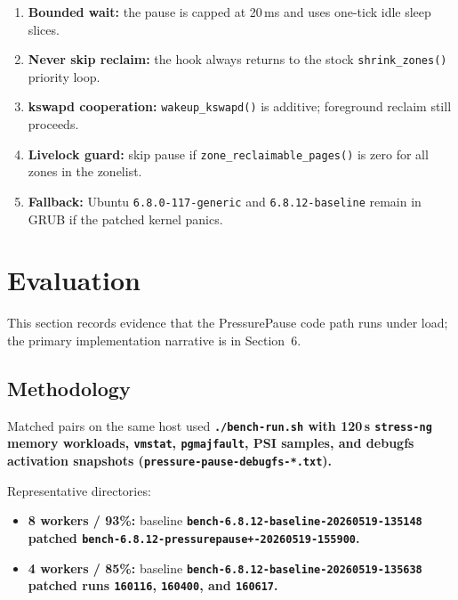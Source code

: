 \documentclass[12pt,a4paper]{article}
\newcommand{\srcfile}[1]{\begingroup\bfseries\color{aublue}\nolinkurl{#1}\endgroup}
\begin{document}
\begin{enumerate}[leftmargin=1.2cm]
    \item \textbf{Bounded wait:} the pause is capped at 20\,ms and uses one-tick idle sleep slices.
    \item \textbf{Never skip reclaim:} the hook always returns to the stock \texttt{shrink\_zones()} priority loop.
    \item \textbf{kswapd cooperation:} \texttt{wakeup\_kswapd()} is additive; foreground reclaim still proceeds.
    \item \textbf{Livelock guard:} skip pause if \texttt{zone\_reclaimable\_pages()} is zero for all zones in the zonelist.
    \item \textbf{Fallback:} Ubuntu \texttt{6.8.0-117-generic} and \texttt{6.8.12-baseline} remain in GRUB if the patched kernel panics.
\end{enumerate}

\section{Evaluation}

This section records evidence that the PressurePause code path runs under load; the primary implementation narrative is in Section~6.

\subsection{Methodology}

Matched pairs on the same host used \srcfile{./bench-run.sh} with 120\,s \texttt{stress-ng} memory workloads, \texttt{vmstat}, \texttt{pgmajfault}, PSI samples, and debugfs activation snapshots (\srcfile{pressure-pause-debugfs-*.txt}).

Representative directories:
\begin{itemize}[leftmargin=1.2cm, itemsep=2pt, topsep=3pt]
    \item \textbf{8 workers / 93\%:} baseline \srcfile{bench-6.8.12-baseline-20260519-135148}\\
    patched \srcfile{bench-6.8.12-pressurepause+-20260519-155900}.
    \item \textbf{4 workers / 85\%:} baseline \srcfile{bench-6.8.12-baseline-20260519-135638}\\
    patched runs \srcfile{160116}, \srcfile{160400}, and \srcfile{160617}.
\end{itemize}
\end{document}
